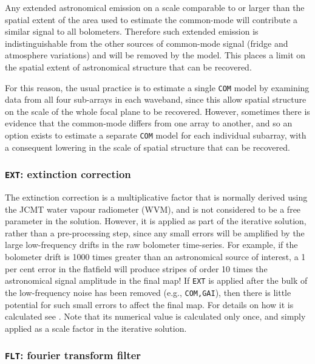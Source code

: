 \documentclass[useAMS,usenatbib,nofootinbib]{mn2e}
\newcommand{\model}[1]{\texttt{#1}}
\begin{document}
Any extended astronomical emission on a scale comparable to or larger
than the spatial extent of the area used to estimate the common-mode will
contribute a similar signal to all bolometers. Therefore such extended
emission is indistinguishable from the other sources of common-mode
signal (fridge and atmosphere variations) and will be removed by the 
model. This places a limit on the spatial extent of astronomical
structure that can be recovered.

For this reason, the usual practice is to estimate a single
\model{COM} model by examining data from all four sub-arrays in each
waveband, since this allow spatial structure on the scale of the whole
focal plane to be recovered. However, sometimes there is evidence that
the common-mode differs from one array to another, and so an option
exists to estimate a separate \model{COM} model for each individual
subarray, with a consequent lowering in the scale of spatial structure
that can be recovered.

\subsubsection{\model{EXT}: extinction correction}
\label{sec:ext}

The extinction correction is a multiplicative factor that is normally
derived using the JCMT water vapour radiometer (WVM), and is not
considered to be a free parameter in the solution. However, it is
applied as part of the iterative solution, rather than a
pre-processing step, since any small errors will be amplified by the
large low-frequency drifts in the raw bolometer time-series. For
example, if the bolometer drift is 1000 times greater than an
astronomical source of interest, a 1 per cent error in the flatfield
will produce stripes of order 10 times the astronomical signal
amplitude in the final map! If \model{EXT} is applied after the bulk
of the low-frequency noise has been removed (e.g., \model{COM,GAI}),
then there is little potential for such small errors to affect the
final map.  For details on how it is calculated see
\citet{dempsey2011}. Note that its numerical value is calculated only
once, and simply applied as a scale factor in the iterative solution.

\subsubsection{\model{FLT}: fourier transform filter}
\label{sec:flt}
\end{document}
